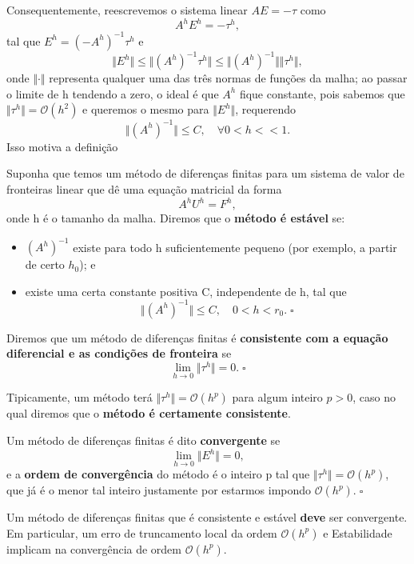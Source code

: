 \documentclass[../differential_methods.tex]{subfiles}
\begin{document}
Consequentemente, reescrevemos o sistema linear \(AE = -\tau \) como
\[
	A^{h}E^{h}=-\tau^{h},
\]
tal que \(E^{h}=(-A^{h})^{-1}\tau^{h}\) e
\[
	\Vert E^{h} \Vert \leq \Vert (A^{h})^{-1}\tau^{h} \Vert \leq \Vert (A^{h})^{-1} \Vert \Vert \tau^{h} \Vert,
\]
onde \(\Vert \cdot  \Vert\) representa qualquer uma das três normas de funções da malha; ao passar o limite de h tendendo a zero, o ideal é que \(A^{h}\) fique constante, pois sabemos que \(\Vert \tau^{h} \Vert = \mathcal{O}(h^{2})\) e queremos o mesmo para \(\Vert E^{h} \Vert\), requerendo
\[
	\Vert (A^{h})^{-1} \Vert \leq C, \quad \forall 0<h<<1.
\]
Isso motiva a definição
\begin{def*}[Estabilidade]
	Suponha que temos um método de diferenças finitas para um sistema de valor de fronteiras linear que dê uma equação matricial da forma
	\[
		A^{h}U^{h} = F^{h},
	\]
	onde h é o tamanho da malha. Diremos que o \textbf{método é estável} se:
	\begin{itemize}
		\item  \((A^{h})^{-1}\) existe para todo h suficientemente pequeno (por exemplo, a partir de certo \(h_{0}\)); e
		\item  existe uma certa constante positiva C, independente de h, tal que
		      \[
			      \Vert (A^{h})^{-1} \Vert \leq C, \quad 0<h<r_{0}. \; \square
		      \]
	\end{itemize}
\end{def*}
\begin{def*}[Consistência]
	Diremos que um método de diferenças finitas é \textbf{consistente com a equação diferencial e as condições de fronteira} se
	\[
		\lim_{h\to 0}\Vert  \tau^{h} \Vert =0.\; \square
	\]
\end{def*}
Tipicamente, um método terá \(\Vert \tau^{h} \Vert = \mathcal{O}(h^{p})\) para algum inteiro \(p>0\), caso no qual diremos que o \textbf{método é certamente consistente}.
\begin{def*}[Convergência]
	Um método de diferenças finitas é dito \textbf{convergente} se
	\[
		\lim_{h\to 0}\Vert E^{h} \Vert =0,
	\]
	e a \textbf{ordem de convergência} do método é o inteiro p tal que \(\Vert \tau^{h} \Vert = \mathcal{O}(h^{p})\), que já é o menor tal inteiro justamente por estarmos impondo \(\mathcal{O}(h^{p}).\; \square\)
\end{def*}
\hypertarget{fundamental_fdm}{
	\begin{theorem*}
		Um método de diferenças finitas que é consistente e estável \textbf{deve} ser convergente. Em particular, um erro de truncamento local da ordem \(\mathcal{O}(h^{p})\) e Estabilidade implicam na convergência de ordem \(\mathcal{O}(h^{p})\).
	\end{theorem*}
}
\end{document}
